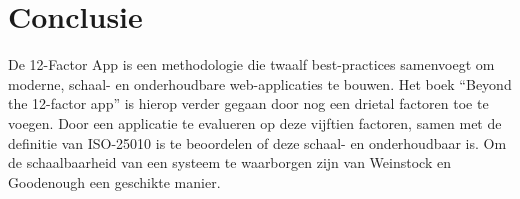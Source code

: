 \section{Conclusie}
De 12-Factor App is een methodologie die twaalf best-practices samenvoegt om moderne, schaal- en onderhoudbare web-applicaties te bouwen. Het boek \enquote{Beyond the 12-factor app} \parencite{Beyond12Factor} is hierop verder gegaan door nog een drietal factoren toe te voegen. Door een applicatie te evalueren op deze vijftien factoren, samen met de definitie van ISO-25010 \parencite{ISO25010} is te beoordelen of deze schaal- en onderhoudbaar is. Om de schaalbaarheid van een systeem te waarborgen zijn  van Weinstock en Goodenough \parencite{OnSystemScalability} een geschikte manier.
